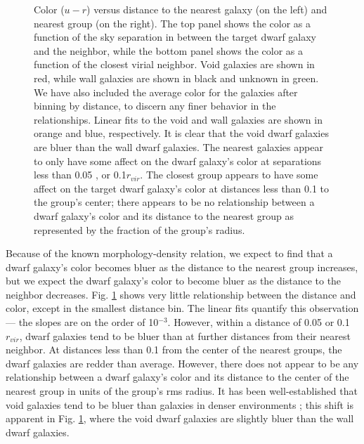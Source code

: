 \begin{figure}
    \caption[$u-r$ versus distance to nearest neighbor and group]{Color ($u-r$) 
    versus distance to the nearest galaxy (on the left) and nearest group (on 
    the right).  The top panel shows the color as a function of the sky 
    separation in \hMpc between the target dwarf galaxy and the neighbor, while 
    the bottom panel shows the color as a function of the closest virial 
    neighbor.  Void galaxies are shown in red, while wall galaxies are shown in 
    black and unknown in green.  We have also included the average color for the 
    galaxies after binning by distance, to discern any finer behavior in the 
    relationships.  Linear fits to the void and wall galaxies are shown in 
    orange and blue, respectively.  It is clear that the void dwarf galaxies are 
    bluer than the wall dwarf galaxies.  The nearest galaxies appear to only 
    have some affect on the dwarf galaxy's color at separations less than 0.05 
    \hMpc, or 0.1$r_{vir}$.  The closest group appears to have some affect on 
    the target dwarf galaxy's color at distances less than 0.1 \hMpc to the 
    group's center; there appears to be no relationship between a dwarf galaxy's 
    color and its distance to the nearest group as represented by the fraction 
    of the group's radius.}
    \label{fig:ur}
\end{figure}

Because of the known morphology-density relation, we expect to find that a dwarf 
galaxy's color becomes bluer as the distance to the nearest group increases, but 
we expect the dwarf galaxy's color to become bluer as the distance to the 
neighbor decreases.  Fig. \ref{fig:ur} shows very little relationship between 
the distance and color, except in the smallest distance bin.  The linear fits 
quantify this observation --- the slopes are on the order of 10$^{-3}$.  
However, within a distance of 0.05 \hMpc or 0.1$r_{vir}$, dwarf galaxies tend 
to be bluer than at further distances from their nearest neighbor.  At distances 
less than 0.1 \hMpc from the center of the nearest groups, the dwarf galaxies 
are redder than average.  However, there does not appear to be any relationship 
between a dwarf galaxy's color and its distance to the center of the nearest 
group in units of the group's rms radius.  It has been well-established that 
void galaxies tend to be bluer than galaxies in denser environments 
\citep{Grogin99,Rojas04,Patiri06,vonBendaBeckmann08,Hoyle12}; this shift is 
apparent in Fig. \ref{fig:ur}, where the void dwarf galaxies are slightly bluer 
than the wall dwarf galaxies.  


